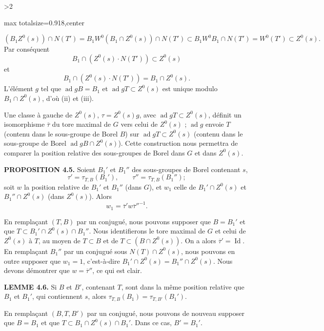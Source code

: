 \documentclass[9pt,twoside]{extarticle}
\newcommand{\EditionPage}[3]{%
  \ifnum#1>2\clearpage\fi
  \pdfbookmark[1]{Printed page #2}{fr-folio-#2}%
  \hypertarget{fr-physical-#1}{}%
  \noindent\begin{adjustbox}{max totalsize={\textwidth}{0.918\textheight},center}
  \begin{minipage}[t]{\textwidth}
  \fontsize{9.4}{11.1}\selectfont\justifying
  #3
  \end{minipage}
  \end{adjustbox}%
}
\begin{document}
\EditionPage{24}{125}{%
\[
(B_1Z^0(s))\cap N(T')
=
B_1W^0(B_1\cap Z^0(s))\cap N(T')
\subset
B_1W^0B_1\cap N(T')
=
W^0(T')
\subset Z^0(s).
\] Par conséquent \[
B_1\cap(Z^0(s)\cdot N(T'))\subset Z^0(s)
\] et \[
B_1\cap(Z^0(s)\cdot N(T'))=B_1\cap Z^0(s).
\] L'élément \(g\) tel que \(\operatorname{ad}gB=B_1\) et \(\operatorname{ad}gT\subset Z^0(s)\) est unique modulo \(B_1\cap Z^0(s)\), d'où (ii) et (iii).\par

Une classe à gauche de \(Z^0(s)\), \(\tau=Z^0(s)g\), avec \(\operatorname{ad}gT\subset Z^0(s)\), définit un isomorphisme \(\overline\tau\) du tore maximal de \(G\) vers celui de \(Z^0(s)\) ; \(\operatorname{ad}g\) envoie \(T\) (contenu dans le sous-groupe de Borel \(B\)) sur \(\operatorname{ad}gT\subset Z^0(s)\) (contenu dans le sous-groupe de Borel \(\operatorname{ad}gB\cap Z^0(s)\)). Cette construction nous permettra de comparer la position relative des sous-groupes de Borel dans \(G\) et dans \(Z^0(s)\).\par

\noindent\textbf{PROPOSITION 4.5.} Soient \(B_1'\) et \(B_1''\) des sous-groupes de Borel contenant \(s\), \[
\tau'=\tau_{T,B}(B_1'),\qquad \tau''=\tau_{T,B}(B_1'');
\] soit \(w\) la position relative de \(B_1'\) et \(B_1''\) (dans \(G\)), et \(w_1\) celle de \(B_1'\cap Z^0(s)\) et \(B_1''\cap Z^0(s)\) (dans \(Z^0(s)\)). Alors \[
w_1=\overline\tau' w\overline\tau''^{-1}.
\]\par

En remplaçant \((T,B)\) par un conjugué, nous pouvons supposer que \(B=B_1'\) et que \(T\subset B_1'\cap Z^0(s)\cap B_1''\). Nous identifierons le tore maximal de \(G\) et celui de \(Z^0(s)\) à \(T\), au moyen de \(T\subset B\) et de \(T\subset(B\cap Z^0(s))\). On a alors \(\overline\tau'=\operatorname{Id}\). En remplaçant \(B_1''\) par un conjugué sous \(N(T)\cap Z^0(s)\), nous pouvons en outre supposer que \(w_1=1\), c'est-à-dire \(B_1'\cap Z^0(s)=B_1''\cap Z^0(s)\). Nous devons démontrer que \(w=\overline\tau''\), ce qui est clair.\par

\noindent\textbf{LEMME 4.6.} Si \(B\) et \(B'\), contenant \(T\), sont dans la même position relative que \(B_1\) et \(B_1'\), qui contiennent \(s\), alors \(\tau_{T,B}(B_1)=\tau_{T,B'}(B_1')\).\par

En remplaçant \((B,T,B')\) par un conjugué, nous pouvons de nouveau supposer que \(B=B_1\) et que \(T\subset B_1\cap Z^0(s)\cap B_1'\). Dans ce cas, \(B'=B_1'\).\par

}
\end{document}
